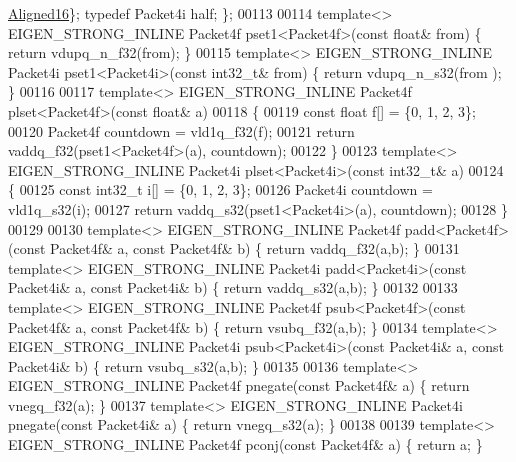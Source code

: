 \begin{DoxyCode}
{      \hyperlink{group__enums_gga45fe06e29902b7a2773de05ba27b47a1af8e2bf74b04c02199f62c5e3c06dbfcc}{Aligned16}\}; \textcolor{keyword}{typedef} Packet4i half; \};
00113 
00114 \textcolor{keyword}{template}<> EIGEN\_STRONG\_INLINE Packet4f pset1<Packet4f>(\textcolor{keyword}{const} \textcolor{keywordtype}{float}&  from) \{ \textcolor{keywordflow}{return} vdupq\_n\_f32(from); \}
00115 \textcolor{keyword}{template}<> EIGEN\_STRONG\_INLINE Packet4i pset1<Packet4i>(\textcolor{keyword}{const} int32\_t&    from)   \{ \textcolor{keywordflow}{return} vdupq\_n\_s32(from
      ); \}
00116 
00117 \textcolor{keyword}{template}<> EIGEN\_STRONG\_INLINE Packet4f plset<Packet4f>(\textcolor{keyword}{const} \textcolor{keywordtype}{float}& a)
00118 \{
00119   \textcolor{keyword}{const} \textcolor{keywordtype}{float} f[] = \{0, 1, 2, 3\};
00120   Packet4f countdown = vld1q\_f32(f);
00121   \textcolor{keywordflow}{return} vaddq\_f32(pset1<Packet4f>(a), countdown);
00122 \}
00123 \textcolor{keyword}{template}<> EIGEN\_STRONG\_INLINE Packet4i plset<Packet4i>(\textcolor{keyword}{const} int32\_t& a)
00124 \{
00125   \textcolor{keyword}{const} int32\_t i[] = \{0, 1, 2, 3\};
00126   Packet4i countdown = vld1q\_s32(i);
00127   \textcolor{keywordflow}{return} vaddq\_s32(pset1<Packet4i>(a), countdown);
00128 \}
00129 
00130 \textcolor{keyword}{template}<> EIGEN\_STRONG\_INLINE Packet4f padd<Packet4f>(\textcolor{keyword}{const} Packet4f& a, \textcolor{keyword}{const} Packet4f& b) \{ \textcolor{keywordflow}{return} 
      vaddq\_f32(a,b); \}
00131 \textcolor{keyword}{template}<> EIGEN\_STRONG\_INLINE Packet4i padd<Packet4i>(\textcolor{keyword}{const} Packet4i& a, \textcolor{keyword}{const} Packet4i& b) \{ \textcolor{keywordflow}{return} 
      vaddq\_s32(a,b); \}
00132 
00133 \textcolor{keyword}{template}<> EIGEN\_STRONG\_INLINE Packet4f psub<Packet4f>(\textcolor{keyword}{const} Packet4f& a, \textcolor{keyword}{const} Packet4f& b) \{ \textcolor{keywordflow}{return} 
      vsubq\_f32(a,b); \}
00134 \textcolor{keyword}{template}<> EIGEN\_STRONG\_INLINE Packet4i psub<Packet4i>(\textcolor{keyword}{const} Packet4i& a, \textcolor{keyword}{const} Packet4i& b) \{ \textcolor{keywordflow}{return} 
      vsubq\_s32(a,b); \}
00135 
00136 \textcolor{keyword}{template}<> EIGEN\_STRONG\_INLINE Packet4f pnegate(\textcolor{keyword}{const} Packet4f& a) \{ \textcolor{keywordflow}{return} vnegq\_f32(a); \}
00137 \textcolor{keyword}{template}<> EIGEN\_STRONG\_INLINE Packet4i pnegate(\textcolor{keyword}{const} Packet4i& a) \{ \textcolor{keywordflow}{return} vnegq\_s32(a); \}
00138 
00139 \textcolor{keyword}{template}<> EIGEN\_STRONG\_INLINE Packet4f pconj(\textcolor{keyword}{const} Packet4f& a) \{ \textcolor{keywordflow}{return} a; \}
}
\end{DoxyCode}
